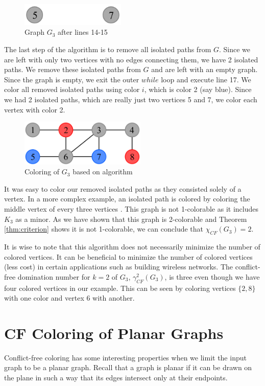 \documentclass{sig-alternate}
\begin{document}
\begin{figure}[h]
	\centering
	\includegraphics[width=5cm]{../figures/algorithm1-step2.pdf}
	\caption{Graph $G_3$ after lines 14-15}\label{fig:algorithm1-step2}
\end{figure}


The last step of the algorithm is to remove all isolated paths from $G$. Since we are left with only two vertices with no edges connecting them, we have 2 isolated paths. We remove these isolated paths from $G$ and are left with an empty graph. Since the graph is empty, we exit the outer $while$ loop and execute line 17. We color all removed isolated paths using color $i$, which is color 2 (say blue). Since we had 2 isolated paths, which are really just two vertices 5 and 7, we color each vertex with color 2.

\begin{figure}[h]
	\centering
	\includegraphics[width=6cm]{../figures/algorithm1-step3.pdf}
	\caption{Coloring of $G_3$ based on algorithm}\label{fig:algorithm1-step3}
\end{figure}

It was easy to color our removed isolated paths as they consisted solely of a vertex. In a more complex example, an isolated path is colored by coloring the middle vertex of every three vertices \cite{abel2017three}. This graph is not 1-colorable as it includes $K_3$ as a minor. As we have shown that this graph is 2-colorable and Theorem \ref{thm:criterion} shows it is not 1-colorable, we can conclude that $\chi_{CF}(G_3) = 2$.

It is wise to note that this algorithm does not necessarily minimize the number of colored vertices. It can be beneficial to minimize the number of colored vertices (less cost) in certain applications such as building wireless networks. The conflict-free domination number for $k=2$ of $G_3$, $\gamma_{CF}^2(G_3)$, is three even though we have four colored vertices in our example. This can be seen by coloring vertices $\{2, 8\}$ with one color and vertex 6 with another.

\section{CF Coloring of Planar Graphs}
\label{sec:planar-coloring}
Conflict-free coloring has some interesting properties when we limit the input graph to be a planar graph. Recall that a graph is planar if it can be drawn on the plane in such a way that its edges intersect only at their endpoints.
\end{document}
